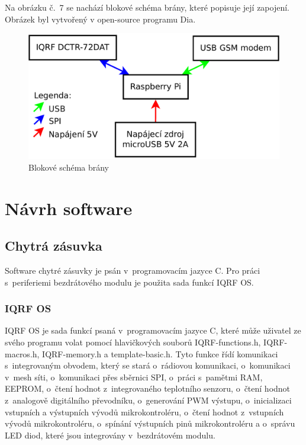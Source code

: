 \documentclass[12pt,a4paper,oneside]{article}
\begin{document}
Na obrázku č.~7 se nachází blokové schéma brány, které popisuje její zapojení. Obrázek byl vytvořený v open-source programu Dia\cite{sw/dia}.

\begin{figure}[H]
\centering
\label{fig:blokove-schema-zasuvky}
\includegraphics[width = 128mm]{img/blokove-schema-brany.pdf}
\caption{Blokové schéma brány}
\end{figure}

\newpage

\section{Návrh software}

\subsection{Chytrá zásuvka}

Software chytré zásuvky je psán v~programovacím jazyce C. Pro práci s~periferiemi bezdrátového modulu je použita sada funkcí IQRF OS. 

\subsubsection{IQRF OS}

IQRF OS je sada funkcí psaná v~programovacím jazyce C, které může uživatel ze svého programu volat pomocí hlavičkových souborů IQRF-functions.h, IQRF-macros.h, IQRF-memory.h a template-basic.h. Tyto funkce řídí komunikaci s~integrovaným obvodem, který se stará o~rádiovou komunikaci, o~komunikaci v~mesh síti, o~komunikaci přes sběrnici SPI, o~práci s~pamětmi RAM, EEPROM, o~čtení hodnot z~integrovaného teplotního senzoru, o~čtení hodnot z~analogově digitálního převodníku, o~generování PWM výstupu, o~inicializaci vstupních a výstupních vývodů mikrokontroléru, o~čtení hodnot z~vstupních vývodů mikrokontroléru, o~spínání výstupních pinů mikrokontroléru a o~správu LED diod, které jsou integrovány v~bezdrátovém modulu. 
\end{document}
